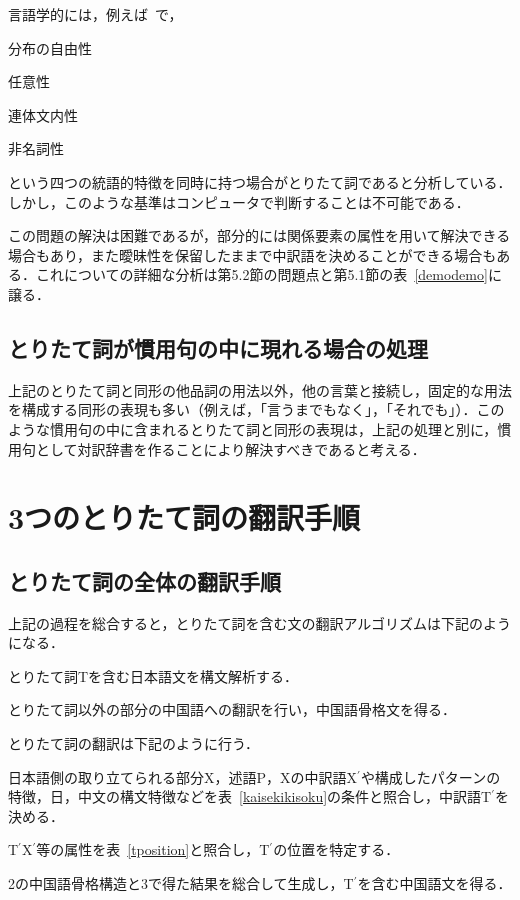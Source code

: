 言語学的には，例えば~\cite{kinsui00}で，

\renewcommand{\theenumi}{}
\begin{enumerates}
 \item 分布の自由性
 \item 任意性
 \item 連体文内性
 \item 非名詞性
\end{enumerates}
という四つの統語的特徴を同時に持つ場合がとりたて詞であると分析している．しかし，このような基準はコンピュータで判断することは不可能である．

この問題の解決は困難であるが，部分的には関係要素の属性を用いて解決できる場合もあり，また曖昧性を保留したままで中訳語を決めることができる場合もある．これについての詳細な分析は第5.2節の問題点と第5.1節の表~\ref{demodemo}に譲る．
　
\subsection{とりたて詞が慣用句の中に現れる場合の処理}
上記のとりたて詞と同形の他品詞の用法以外，他の言葉と接続し，固定的な用法を構成する同形の表現も多い（例えば，「言うまでもなく」，「それでも」）．このような慣用句の中に含まれるとりたて詞と同形の表現は，上記の処理と別に，慣用句として対訳辞書を作ることにより解決すべきであると考える．


\section{3つのとりたて詞の翻訳手順}
\subsection{とりたて詞の全体の翻訳手順}
上記の過程を総合すると，とりたて詞を含む文の翻訳アルゴリズムは下記のようになる．

\renewcommand{\labelenumi}{}
\renewcommand{\theenumi}{}
\renewcommand{\labelenumii}{}
\renewcommand{\theenumii}{}
\begin{enumeratess}
 \item とりたて詞Tを含む日本語文を構文解析する．
 \item とりたて詞以外の部分の中国語への翻訳を行い，中国語骨格文を得る．
 \item とりたて詞の翻訳は下記のように行う．
       \begin{enumeratess}
	\item 日本語側の取り立てられる部分X，述語P，Xの中訳語X$^{\prime}$や構成したパターンの特徴，日，中文の構文特徴などを表~\ref{kaisekikisoku}の条件と照合し，中訳語T$^{\prime}$を決める．
	\item T$^{\prime}$X$^{\prime}$等の属性を表~\ref{tposition}と照合し，T$^{\prime}$の位置を特定する．
       \end{enumeratess}
 \item 2の中国語骨格構造と3で得た結果を総合して生成し，T$^{\prime}$を含む中国語文を得る．
\end{enumeratess}


